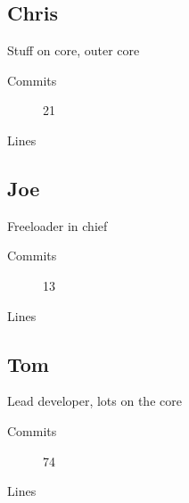  \subsection{Chris}
    Stuff on core, outer core
    \begin{description}
      \item[Commits] 21
      \item[Lines]
    \end{description}

  \subsection{Joe}
    Freeloader in chief
    \begin{description}
      \item[Commits] 13
      \item[Lines]
    \end{description}

  \subsection{Tom}
    Lead developer, lots on the core
    \begin{description}
      \item[Commits] 74
      \item[Lines]
    \end{description}
